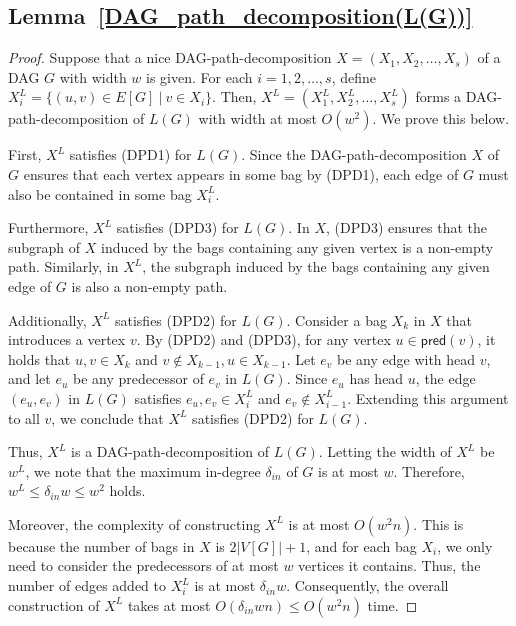 \documentclass[runningheads]{llncs}
\theoremstyle{plain}
\theoremstyle{definition}
\begin{document}
\subsection{\textbf{Lemma~\ref{DAG_path_decomposition(L(G))}}}\label{appendix_B1}
\begin{proof}
    Suppose that a nice DAG-path-decomposition $X=(X_1, X_2, \dots, X_s)$ of a DAG $G$ with width $w$ is given. For each $i=1, 2, \dots, s$, define $X^L_i = \{(u, v) \in E[G]~|~v \in X_i \}$. Then, $X^L=(X^L_1, X^L_2, \dots, X^L_s)$ forms a DAG-path-decomposition of $L(G)$ with width at most $O(w^2)$. We prove this below. 
    
    First, $X^L$ satisfies (DPD1) for $L(G)$. Since the DAG-path-decomposition $X$ of $G$ ensures that each vertex appears in some bag by (DPD1), each edge of $G$ must also be contained in some bag $X^L_i$. 
    
    Furthermore, $X^L$ satisfies (DPD3) for $L(G)$. In $X$, (DPD3) ensures that the subgraph of $X$ induced by the bags containing any given vertex is a non-empty path. Similarly, in $X^L$, the subgraph induced by the bags containing any given edge of $G$ is also a non-empty path.
    
    Additionally, $X^L$ satisfies (DPD2) for $L(G)$. Consider a bag $X_k$ in $X$ that introduces a vertex $v$. By (DPD2) and (DPD3), for any vertex $u \in \mathsf{pred}(v)$, it holds that $u, v \in X_k$ and $v \notin X_{k-1}, u \in X_{k-1}$. Let $e_v$ be any edge with head $v$, and let $e_u$ be any predecessor of $e_v$ in $L(G)$. Since $e_u$ has head $u$, the edge $(e_u, e_v)$ in $L(G)$ satisfies $e_u, e_v \in X^L_i$ and $e_v \notin X^L_{i-1}$. Extending this argument to all $v$, we conclude that $X^L$ satisfies (DPD2) for $L(G)$. 
    
    Thus, $X^L$ is a DAG-path-decomposition of $L(G)$. Letting the width of $X^L$ be $w^L$, we note that the maximum in-degree $\delta_{in}$ of $G$ is at most $w$. Therefore, $w^L \leq \delta_{in} w \leq w^2$ holds. 

    Moreover, the complexity of constructing $X^L$ is at most $O(w^2n)$. This is because the number of bags in $X$ is $2|V[G]|+1$, and for each bag $X_i$, we only need to consider the predecessors of at most $w$ vertices it contains. Thus, the number of edges added to $X^L_i$ is at most $\delta_{in}w$. Consequently, the overall construction of $X^L$ takes at most $O(\delta_{in}wn) \leq O(w^2n)$ time.
\end{proof}
\end{document}
